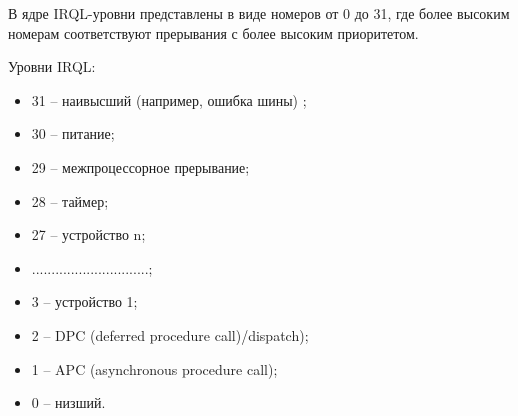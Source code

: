 В ядре IRQL-уровни представлены в виде номеров от 0 до 31, где более высоким номерам соответствуют прерывания с более высоким приоритетом.

Уровни IRQL:
\begin{itemize}[label*=---]
	\item 31 -- наивысший (например, ошибка шины) ;
	\item 30 -- питание;
	\item 29 -- межпроцессорное прерывание;
	\item 28 -- таймер;
	\item 27 -- устройство n;
	\item ..............................;
	\item 3 -- устройство 1;
	\item 2 -- DPC (deferred procedure call)/dispatch);
	\item 1 -- APC (asynchronous procedure call);
	\item 0 -- низший.
\end{itemize}
